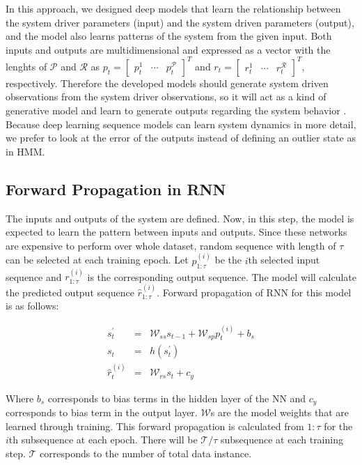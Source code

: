 In this approach, we designed deep models that learn the relationship between the system driver parameters (input) and the system driven parameters (output), and the model also learns patterns of the system from the given input. 
Both inputs and outputs are multidimensional and expressed as a vector with the lenghts of $\mathcal{P}$ and $\mathcal{R}$ as $p_t = \begin{bmatrix} p_{t}^{1} & \cdots & p_{t}^{\mathcal{P}} \end{bmatrix}^T$ and $r_t = \begin{bmatrix} r_{t}^{1} & \cdots & r_{t}^{\mathcal{R}} \end{bmatrix}^T$, respectively. 
Therefore the developed models should generate system driven observations from the system driver observations, so it will act as a kind of generative model and learn to generate outputs regarding the system behavior \cite{malhotra2015long}.
Because deep learning sequence models can learn system dynamics in more detail, we prefer to look at the error of the outputs instead of defining an outlier state as in HMM.

\subsection{Forward Propagation in RNN}

The inputs and outputs of the system are defined. Now, in this step, the model is expected to learn the pattern between inputs and outputs. 
Since these networks are expensive to perform over whole dataset, random sequence with length of $\tau$ can be selected at each training epoch. Let $p_{1:\tau}^{(i)}$ be the $i$th selected input sequence and $r_{1:\tau}^{(i)}$ is the corresponding output sequence. The model will calculate the predicted output sequence $\hat{r}_{1:\tau}^{(i)}$.
Forward propagation of RNN for this model is as follows:

\begin{eqnarray}
     s^{\prime}_{t} &=& \mathcal{W}_{ss}s_{t-1} + \mathcal{W}_{sp}p^{(i)}_t + b_s\\ 
     s_{t} &=& h \left(s^{\prime}_{t}\right) \\ 
     \hat{r}^{(i)}_{t} &=& \mathcal{W}_{rs}s_t + c_y \label{eq:rnn-result}
\end{eqnarray}

Where $b_s$ corresponds to bias terms in the hidden layer of the NN and $c_y$ corresponds to bias term in the output layer. $\mathcal{W}$s are the model weights that are learned through training. This forward propagation is calculated from $1:\tau$ for the $i$th subsequence at each epoch. There will be $\mathcal{T}/\tau$ subsequence at each training step. $\mathcal{T}$ corresponds to the number of total data instance.

